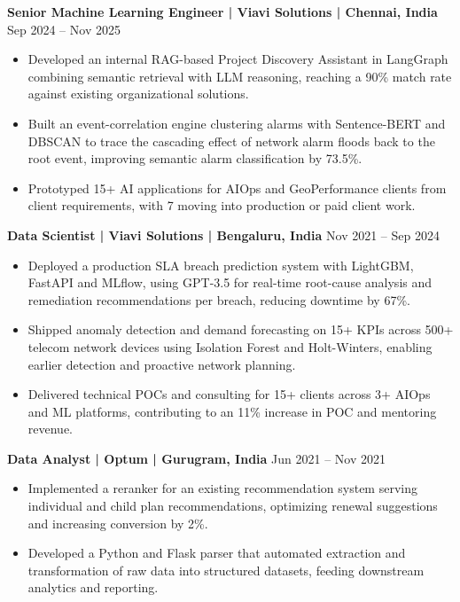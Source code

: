 \documentclass[10pt,a4paper]{article}
\newcommand{\role}[2]{\textbf{#1} \hfill #2\par}
\begin{document}
\role{Senior Machine Learning Engineer | Viavi Solutions | Chennai, India}{Sep 2024 -- Nov 2025}
\begin{itemize}
  \item Developed an internal RAG-based Project Discovery Assistant in LangGraph combining semantic retrieval with LLM
  reasoning, reaching a 90\% match rate against existing organizational solutions.
  \item Built an event-correlation engine clustering alarms with Sentence-BERT and DBSCAN to trace the cascading
  effect of network alarm floods back to the root event, improving semantic alarm classification by 73.5\%.
  \item Prototyped 15+ AI applications for AIOps and GeoPerformance clients from client requirements, with 7 moving
  into production or paid client work.
\end{itemize}
\vspace{3pt}

\role{Data Scientist | Viavi Solutions | Bengaluru, India}{Nov 2021 -- Sep 2024}
\begin{itemize}
  \item Deployed a production SLA breach prediction system with LightGBM, FastAPI and MLflow, using GPT-3.5 for
  real-time root-cause analysis and remediation recommendations per breach, reducing downtime by 67\%.
  \item Shipped anomaly detection and demand forecasting on 15+ KPIs across 500+ telecom network devices using
  Isolation Forest and Holt-Winters, enabling earlier detection and proactive network planning.
  \item Delivered technical POCs and consulting for 15+ clients across 3+ AIOps and ML platforms, contributing to an
  11\% increase in POC and mentoring revenue.
\end{itemize}
\vspace{3pt}

\role{Data Analyst | Optum | Gurugram, India}{Jun 2021 -- Nov 2021}
\begin{itemize}
  \item Implemented a reranker for an existing recommendation system serving individual and child plan
  recommendations, optimizing renewal suggestions and increasing conversion by 2\%.
  \item Developed a Python and Flask parser that automated extraction and transformation of raw data into structured
  datasets, feeding downstream analytics and reporting.
\end{itemize}
\vspace{3pt}
\end{document}
